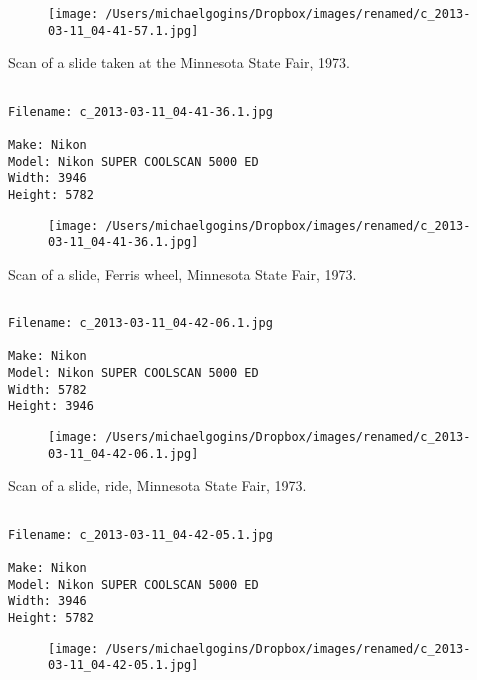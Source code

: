 \documentclass[11pt,letter,DIV=14,paper=landscape]{scrbook}
\begin{document}
\begin{figure}
\texttt{[image: /Users/michaelgogins/Dropbox/images/renamed/c\_2013-03-11\_04-41-57.1.jpg]}
\end{figure}
    
\clearpage
\noindent Scan of a slide taken at the Minnesota State Fair, 1973.
\noindent
\begin{lstlisting}

Filename: c_2013-03-11_04-41-36.1.jpg

Make: Nikon
Model: Nikon SUPER COOLSCAN 5000 ED
Width: 3946
Height: 5782
\end{lstlisting}
\clearpage

\begin{figure}
\texttt{[image: /Users/michaelgogins/Dropbox/images/renamed/c\_2013-03-11\_04-41-36.1.jpg]}
\end{figure}
    
\clearpage
\noindent Scan of a slide, Ferris wheel, Minnesota State Fair, 1973.
\noindent
\begin{lstlisting}

Filename: c_2013-03-11_04-42-06.1.jpg

Make: Nikon
Model: Nikon SUPER COOLSCAN 5000 ED
Width: 5782
Height: 3946
\end{lstlisting}
\clearpage

\begin{figure}
\texttt{[image: /Users/michaelgogins/Dropbox/images/renamed/c\_2013-03-11\_04-42-06.1.jpg]}
\end{figure}
    
\clearpage
\noindent Scan of a slide, ride, Minnesota State Fair, 1973.
\noindent
\begin{lstlisting}

Filename: c_2013-03-11_04-42-05.1.jpg

Make: Nikon
Model: Nikon SUPER COOLSCAN 5000 ED
Width: 3946
Height: 5782
\end{lstlisting}
\clearpage

\begin{figure}
\texttt{[image: /Users/michaelgogins/Dropbox/images/renamed/c\_2013-03-11\_04-42-05.1.jpg]}
\end{figure}
    
\end{document}
